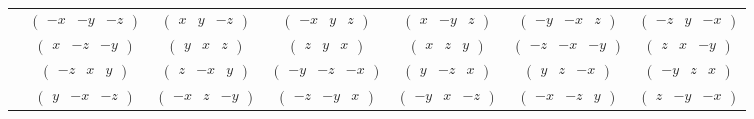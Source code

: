 \documentclass[fleqn,9pt,landscape]{jsarticle}
\begin{document}
\begin{center}
\begin{longtable}{ccccccc}
& $ \begin{pmatrix} - x & - y & - z \end{pmatrix} $ & $ \begin{pmatrix} x & y & - z \end{pmatrix} $ & $ \begin{pmatrix} - x & y & z \end{pmatrix} $ & $ \begin{pmatrix} x & - y & z \end{pmatrix} $ & $ \begin{pmatrix} - y & - x & z \end{pmatrix} $ & $ \begin{pmatrix} - z & y & - x \end{pmatrix} $ \\
& $ \begin{pmatrix} x & - z & - y \end{pmatrix} $ & $ \begin{pmatrix} y & x & z \end{pmatrix} $ & $ \begin{pmatrix} z & y & x \end{pmatrix} $ & $ \begin{pmatrix} x & z & y \end{pmatrix} $ & $ \begin{pmatrix} - z & - x & - y \end{pmatrix} $ & $ \begin{pmatrix} z & x & - y \end{pmatrix} $ \\
& $ \begin{pmatrix} - z & x & y \end{pmatrix} $ & $ \begin{pmatrix} z & - x & y \end{pmatrix} $ & $ \begin{pmatrix} - y & - z & - x \end{pmatrix} $ & $ \begin{pmatrix} y & - z & x \end{pmatrix} $ & $ \begin{pmatrix} y & z & - x \end{pmatrix} $ & $ \begin{pmatrix} - y & z & x \end{pmatrix} $ \\
& $ \begin{pmatrix} y & - x & - z \end{pmatrix} $ & $ \begin{pmatrix} - x & z & - y \end{pmatrix} $ & $ \begin{pmatrix} - z & - y & x \end{pmatrix} $ & $ \begin{pmatrix} - y & x & - z \end{pmatrix} $ & $ \begin{pmatrix} - x & - z & y \end{pmatrix} $ & $ \begin{pmatrix} z & - y & - x \end{pmatrix} $ \\

\end{longtable}
\end{center}
\end{document}
